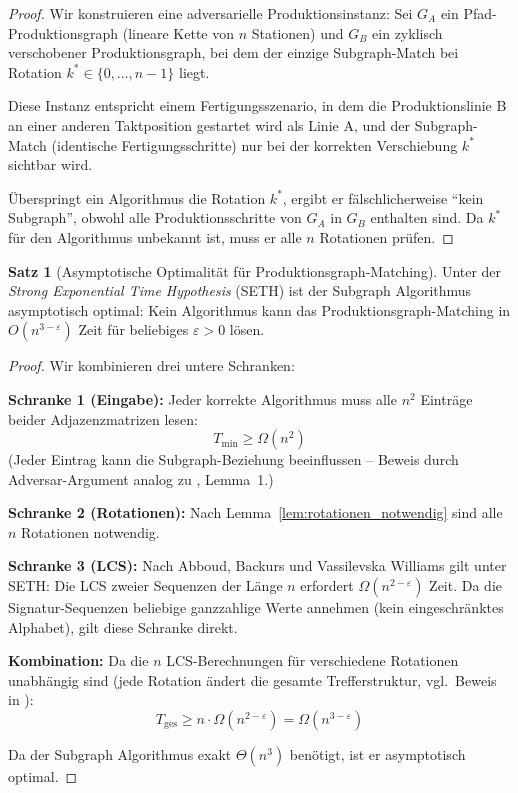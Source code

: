 ﻿\documentclass[a4paper,12pt]{article}
\theoremstyle{definition}
\newtheorem{satz}{Satz}
\begin{document}
\begin{proof}
Wir konstruieren eine adversarielle Produktionsinstanz: Sei $G_A$ ein Pfad-Produktionsgraph
(lineare Kette von $n$ Stationen) und $G_B$ ein zyklisch verschobener Produktionsgraph,
bei dem der einzige Subgraph-Match bei Rotation $k^* \in \{0,\ldots,n-1\}$ liegt.

Diese Instanz entspricht einem Fertigungsszenario, in dem die Produktionslinie B an einer
anderen Taktposition gestartet wird als Linie A, und der Subgraph-Match (identische
Fertigungsschritte) nur bei der korrekten Verschiebung $k^*$ sichtbar wird.

Überspringt ein Algorithmus die Rotation $k^*$, ergibt er fälschlicherweise ``kein Subgraph'',
obwohl alle Produktionsschritte von $G_A$ in $G_B$ enthalten sind. Da $k^*$ für den
Algorithmus unbekannt ist, muss er alle $n$ Rotationen prüfen.
\end{proof}

\begin{satz}[Asymptotische Optimalität für Produktionsgraph-Matching]
\label{satz:optimalitaet}
Unter der \emph{Strong Exponential Time Hypothesis} (SETH) ist der Subgraph Algorithmus
asymptotisch optimal: Kein Algorithmus kann das Produktionsgraph-Matching in $O(n^{3-\varepsilon})$
Zeit für beliebiges $\varepsilon > 0$ lösen.
\end{satz}

\begin{proof}
Wir kombinieren drei untere Schranken:

\textbf{Schranke 1 (Eingabe):} Jeder korrekte Algorithmus muss alle $n^2$ Einträge
beider Adjazenzmatrizen lesen:
\[
T_{\text{min}} \geq \Omega(n^2)
\]
(Jeder Eintrag kann die Subgraph-Beziehung beeinflussen -- Beweis durch Adversar-Argument
analog zu \cite{epp2026}, Lemma~1.)

\textbf{Schranke 2 (Rotationen):} Nach Lemma~\ref{lem:rotationen_notwendig} sind alle $n$
Rotationen notwendig.

\textbf{Schranke 3 (LCS):} Nach Abboud, Backurs und Vassilevska Williams \cite{abboud2015lcs}
gilt unter SETH: Die LCS zweier Sequenzen der Länge $n$ erfordert $\Omega(n^{2-\varepsilon})$ Zeit.
Da die Signatur-Sequenzen beliebige ganzzahlige Werte annehmen (kein eingeschränktes Alphabet),
gilt diese Schranke direkt.

\textbf{Kombination:} Da die $n$ LCS-Berechnungen für verschiedene Rotationen unabhängig
sind (jede Rotation ändert die gesamte Trefferstruktur, vgl.\ Beweis in \cite{epp2026}):
\[
T_{\text{ges}} \geq n \cdot \Omega(n^{2-\varepsilon}) = \Omega(n^{3-\varepsilon})
\]

Da der Subgraph Algorithmus exakt $\Theta(n^3)$ benötigt, ist er asymptotisch optimal.
\end{proof}
\end{document}
